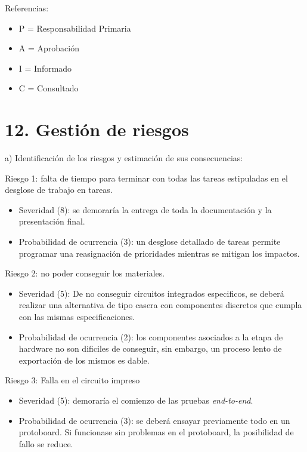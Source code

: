 \documentclass[11pt]{charter}
\begin{document}
{\footnotesize
Referencias:
\begin{itemize}
	\item P = Responsabilidad Primaria
	\item A = Aprobación
	\item I = Informado
	\item C = Consultado
\end{itemize}
} %


\section{12. Gestión de riesgos}
\label{sec:riesgos}
a) Identificación de los riesgos y estimación de sus consecuencias:
 
Riesgo 1: falta de tiempo para terminar con todas las tareas estipuladas en el desglose de trabajo en tareas.
\begin{itemize}
\item Severidad (8): se demoraría la entrega de toda la documentación y la presentación final.\\
\item Probabilidad de ocurrencia (3): un desglose detallado de tareas permite programar una reasignación de prioridades mientras se mitigan los impactos.\\
\end{itemize}   

Riesgo 2: no poder conseguir los materiales.
\begin{itemize}
\item Severidad (5): De no conseguir circuitos integrados especificos, se deberá realizar una alternativa de tipo casera con componentes discretos que cumpla con las mismas especificaciones.
\item Probabilidad de ocurrencia (2): los componentes asociados a la etapa de hardware no son dificiles de conseguir, sin embargo, un proceso lento de exportación de los mismos es dable.
\end{itemize}


Riesgo 3: Falla en el circuito impreso
\begin{itemize}
\item Severidad (5): demoraría el comienzo de las pruebas \textit{end-to-end}.
\item Probabilidad de ocurrencia (3): se deberá ensayar previamente todo en un protoboard. Si funcionase sin problemas en el protoboard, la posibilidad de fallo se reduce.
\end{itemize}
\end{document}

